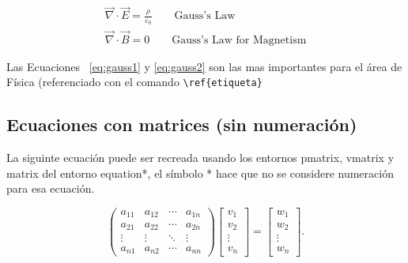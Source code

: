 \documentclass[conference]{IEEEtran}
\begin{document}
            \setcounter{equation}{1}
            \begin{gather}
                \vec{\nabla} \cdot \vec{E} = \frac{\rho}{\varepsilon_0} \qquad \text{Gauss's Law} \label{eq:gauss1} \\
                \vec{\nabla} \cdot \vec{B} = 0 \qquad \text{Gauss's Law for Magnetism} \label{eq:gauss2}
            \end{gather}
    
            \noindent 
            Las Ecuaciones ~\ref{eq:gauss1} y \ref{eq:gauss2} son las mas importantes para el área 
            de Física (referenciado con el comando \verb|\ref{etiqueta}|
            
            \subsection{Ecuaciones con matrices (sin numeración)}
            
            La siguinte ecuación puede ser recreada usando los entornos
            pmatrix, vmatrix y matrix del entorno equation*, el símbolo * hace  que no se considere numeración para esa ecuación.
        
            \begin{equation*}
                \begin{pmatrix}
                a_{11} & a_{12} & \cdots & a_{1n}\\
                a_{21} & a_{22} & \cdots & a_{2n}\\
                \vdots & \vdots & \ddots & \vdots\\
                a_{n1} & a_{n2} & \cdots & a_{nn}
                \end{pmatrix}
                \begin{bmatrix}
                v_1\\ v_2\\ \vdots\\ v_n
                \end{bmatrix}
                =
                \begin{bmatrix}
                w_1\\ w_2\\ \vdots\\ w_n
                \end{bmatrix}.
            \end{equation*}
    
        
\end{document}
